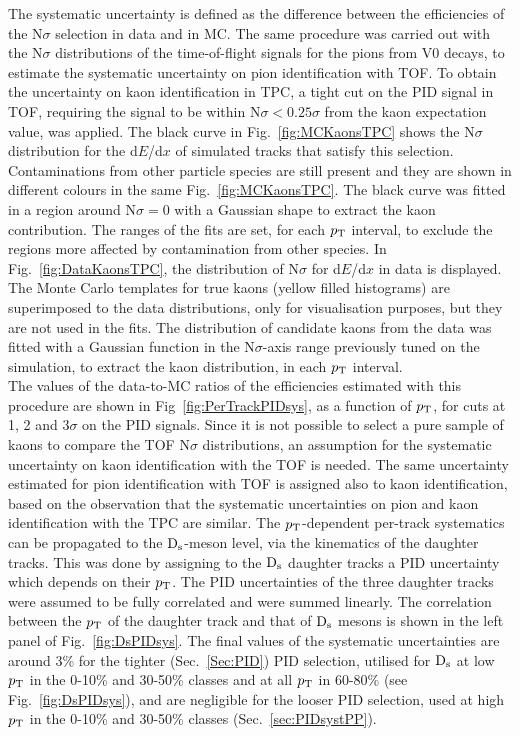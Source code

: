 The systematic uncertainty is defined as the difference between the efficiencies 
 of the N$\sigma$ selection in data and in MC.
The same procedure
was carried out with the N$\sigma$ distributions of the time-of-flight signals 
for the pions from V0 decays, to estimate the systematic uncertainty on pion identification with TOF.
To obtain the uncertainty on kaon identification in TPC, a tight cut on the PID 
signal in TOF, requiring the signal to be within N$\sigma < 0.25\sigma$ from the 
kaon expectation value, was applied. 
The black curve in Fig.~\ref{fig:MCKaonsTPC} shows the 
N$\sigma$ distribution for the d$E$/d$x$ of simulated tracks that satisfy this selection.
Contaminations from other particle species are still present and they
are shown in different colours in the same Fig.~\ref{fig:MCKaonsTPC}. 
The black curve was fitted in a region around N$\sigma=0$ with a Gaussian shape 
to extract the kaon contribution. The ranges of the fits are set, for each $p_{\rm T}$ interval, to exclude 
the regions more affected by contamination from other species.
In Fig.~\ref{fig:DataKaonsTPC}, the distribution of N$\sigma$ for d$E$/d$x$ in data is displayed. 
The Monte Carlo templates for true 
kaons (yellow filled histograms) are superimposed to the data distributions, 
only for visualisation purposes, but they are not used in the fits. The distribution of candidate kaons from the data
was fitted with a Gaussian function in the N$\sigma$-axis range previously tuned on the simulation,
to extract the kaon distribution, in each $p_{\rm T}$ interval.\\
The values of the data-to-MC ratios
of the efficiencies estimated with this procedure are shown in Fig~\ref{fig:PerTrackPIDsys}, as a function of $p_{\rm T}$,
for cuts at 1, 2 and 3$\sigma$ on the PID signals. 
Since it is not possible to select a pure sample of kaons to compare the TOF N$\sigma$
distributions, an assumption for the systematic uncertainty on kaon
identification with the TOF is needed. The same uncertainty estimated
for pion identification with TOF is assigned also to kaon identification, based on
the observation that the systematic uncertainties on pion and kaon identification
with the TPC are similar.
The $p_{\rm T}$-dependent per-track systematics can be propagated to the ${\rm D_s}$-meson level, via the kinematics of
the daughter tracks.
This was done by assigning to the ${\rm D_s}$ daughter tracks a PID uncertainty 
which depends on their $p_{\rm T}$. The PID uncertainties of the three daughter tracks
were assumed to be fully correlated and were summed linearly.
The correlation between the $p_{\rm T}$ of the daughter track and that of ${\rm D_s}$ mesons is shown in the
left panel of Fig.~\ref{fig:DsPIDsys}.
The final values of the systematic uncertainties are around 
3\% for the tighter (Sec.~\ref{Sec:PID}) PID selection, utilised for ${\rm D_s}$ at low $p_{\rm T}$ in the 0-10\% and 30-50\% classes and at all $p_{\rm T}$ in 60-80\% (see Fig.~\ref{fig:DsPIDsys}), and are negligible for the
looser PID selection, used at high $p_{\rm T}$ in the 0-10\% and 30-50\% classes (Sec.~\ref{sec:PIDsystPP}).

